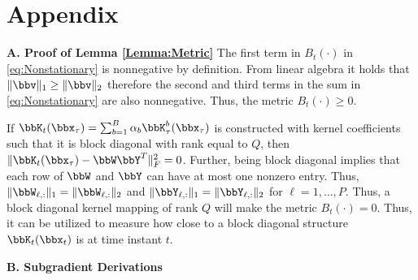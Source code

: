 \documentclass[10pt,final]{IEEEtran}
\begin{document}

\section{Appendix}
\noindent \textbf{A. Proof of Lemma \ref{Lemma:Metric}}\label{Apdx:A}\newline
The first term in $B_t(\cdot)$ in \eqref{eq:Nonstationary} is nonnegative by definition. From linear algebra it holds that $\|\bbv\|_{1}\geq \|\bbv\|_2$ therefore the second and third terms in the sum in \eqref{eq:Nonstationary} are also nonnegative. Thus, the metric $B_t(\cdot)\geq 0$.

If $\bbK_t(\bbx_{\tau})=\sum_{b=1}^B\alpha_b\bbK^b_{\tau}(\bbx_{\tau})$ is constructed with kernel coefficients such that it is block diagonal with rank equal to $Q$, then $\|\bbK_t(\bbx_{\tau})-\bbW\bbY^T\|_{F}^2=0$. Further, being block diagonal implies that each row of $\bbW$ and $\bbY$ can have at most one nonzero entry. Thus, 
$\|\bbW_{\ell,:}\|_1=\|\bbW_{\ell,:}\|_2$ and $\|\bbY_{\ell,:}\|_1=\|\bbY_{\ell,:}\|_2$ for $\ell=1,\ldots,P$. Thus, a block diagonal kernel mapping of rank $Q$ will make the metric $B_t(\cdot)=0$. Thus, it can be utilized to measure how close to a block diagonal structure $\bbK_t(\bbx_{t})$ is at time instant $t$. \myQED

\noindent\textbf{B. Subgradient Derivations}\label{Apdx:B}

\end{document}
